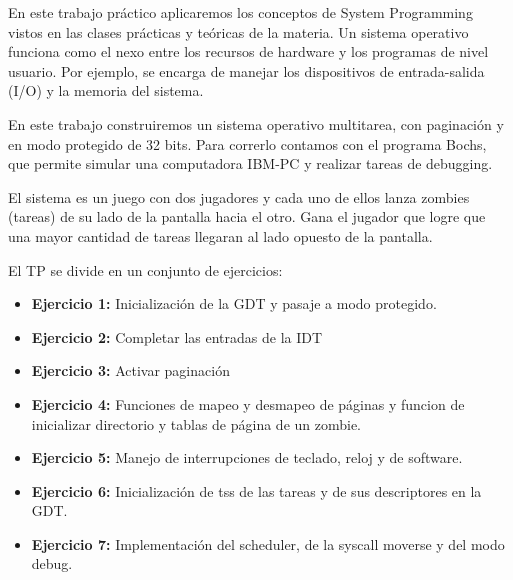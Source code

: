 \par{En este trabajo pr\'actico aplicaremos los conceptos de System Programming vistos en las clases pr\'acticas y te\'oricas de la materia. Un sistema operativo funciona como el nexo entre los recursos de hardware y los programas de nivel usuario. Por ejemplo, se encarga de manejar los dispositivos de entrada-salida (I/O) y la memoria del sistema.}
\par{En este trabajo construiremos un sistema operativo multitarea, con paginaci\'on y en modo protegido de 32 bits. Para correrlo contamos con el programa Bochs, que permite simular una computadora IBM-PC y realizar tareas de debugging.}
\par{El sistema es un juego con dos jugadores y  cada uno de ellos lanza zombies (tareas) de su lado de la pantalla hacia el otro. Gana el jugador que logre que una mayor cantidad de tareas llegaran al lado opuesto de la pantalla.}
\par{El TP se divide en un conjunto de ejercicios:}
\begin{itemize}
    \item \textbf{Ejercicio 1:} Inicializaci\'on de la GDT y pasaje a modo protegido.
    \item \textbf{Ejercicio 2:} Completar las entradas de la IDT
    \item \textbf{Ejercicio 3:} Activar paginaci\'on
    \item \textbf{Ejercicio 4:} Funciones de mapeo y desmapeo de p\'aginas y funcion de inicializar directorio y tablas de p\'agina de un zombie.
    \item \textbf{Ejercicio 5:} Manejo de interrupciones de teclado, reloj y de software.
    \item \textbf{Ejercicio 6:} Inicializaci\'on de tss de las tareas y de sus descriptores en la GDT.
    \item \textbf{Ejercicio 7:} Implementaci\'on del scheduler, de la syscall moverse y del modo debug.
\end{itemize}